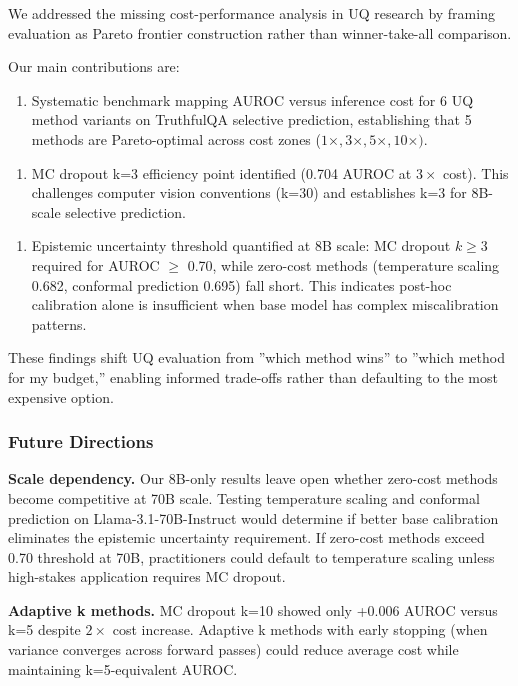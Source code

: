 
We addressed the missing cost-performance analysis in UQ research by framing evaluation as Pareto frontier construction rather than winner-take-all comparison.

Our main contributions are:

\begin{enumerate}
\item Systematic benchmark mapping AUROC versus inference cost for 6 UQ method variants on TruthfulQA selective prediction, establishing that 5 methods are Pareto-optimal across cost zones ($1\times, 3\times, 5\times, 10\times )$.
\end{enumerate}

\begin{enumerate}
\item MC dropout k=3 efficiency point identified (0.704 AUROC at $3\times$ cost). This challenges computer vision conventions (k=30) and establishes k=3 for 8B-scale selective prediction.
\end{enumerate}

\begin{enumerate}
\item Epistemic uncertainty threshold quantified at 8B scale: MC dropout $k\geq 3$ required for AUROC $\geq$ 0.70, while zero-cost methods (temperature scaling 0.682, conformal prediction 0.695) fall short. This indicates post-hoc calibration alone is insufficient when base model has complex miscalibration patterns.
\end{enumerate}

These findings shift UQ evaluation from ''which method wins'' to ''which method for my budget,'' enabling informed trade-offs rather than defaulting to the most expensive option.

\subsubsection{Future Directions}

\textbf{Scale dependency.} Our 8B-only results leave open whether zero-cost methods become competitive at 70B scale. Testing temperature scaling and conformal prediction on Llama-3.1-70B-Instruct would determine if better base calibration eliminates the epistemic uncertainty requirement. If zero-cost methods exceed 0.70 threshold at 70B, practitioners could default to temperature scaling unless high-stakes application requires MC dropout.

\textbf{Adaptive k methods.} MC dropout k=10 showed only +0.006 AUROC versus k=5 despite $2\times$ cost increase. Adaptive k methods with early stopping (when variance converges across forward passes) could reduce average cost while maintaining k=5-equivalent AUROC.

